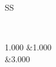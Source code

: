 \begin{longtable}{SS}
\caption{The first table}\label{}\\
\toprule

1.000	&1.000	\\	&3.000	\\
\bottomrule
\end{longtable}
